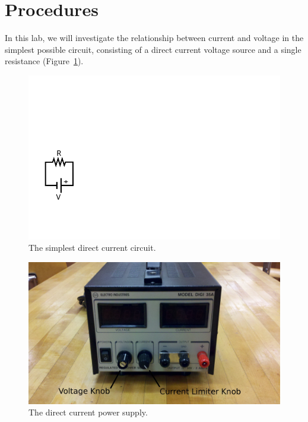 \documentclass[12pt]{article}
\begin{document}
\section{Procedures}
\label{sec:procedures}

In this lab, we will investigate the relationship between current and
voltage in the simplest possible circuit, consisting of a direct
current voltage source and a single resistance
(Figure~\ref{fig:simple}).
\begin{figure}
  \centering
  \includegraphics[width=\textwidth/5]{figures/simplest}
  \caption{The simplest direct current circuit.}
  \label{fig:simple}
\end{figure}
\begin{figure}
  \centering
\includegraphics[width=\textwidth/2]{figures/electro_digi35a_labeled}
  \caption{The direct current power supply.}
  \label{fig:dcps}
\end{figure}
\end{document}
